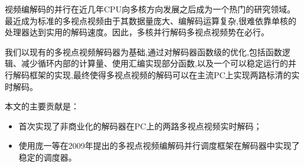 

\makeatletter
\ifthu@bachelor\relax\else
  \ifthu@doctor
  \else
    \ifthu@master
    \fi
  \fi
\fi
\makeatother



\cleardoublepage
\begin{cabstract}

视频编解码的并行在近几年CPU向多核方向发展之后成为一个热门的研究领域。最近成为标准的多视点视频由于其数据量庞大、编解码运算复杂,很难依靠单核的处理器达到实用的解码速度。因此，多核并行解码多视点视频势在必行。

我们以现有的多视点视频解码器为基础,通过对解码器函数级的优化,包括函数逻辑、减少循环内部的计算量、使用汇编实现部分函数,以及一个可以稳定运行的并行解码框架的实现,最终使得多视点视频的解码可以在主流PC上实现两路标清的实时解码。

本文的主要贡献是：
\begin{itemize}
\item 首次实现了非商业化的解码器在PC上的两路多视点视频实时解码；
\item 使用庞一等在2009年提出的多视点视频编解码并行调度框架\cite{pang2009framework}在解码器中实现了稳定的调度器。
\end{itemize}

\end{cabstract}


